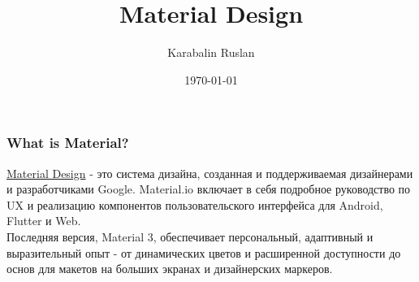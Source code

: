 \documentclass[12pt]{beamer}
\title{Material Design}
\author{Karabalin Ruslan}
\date{\today}
\begin{document}
	
	\begin{frame}

		\titlepage

	\end{frame}
	
	\begin{frame}
		\frametitle{What is Material?}
		
		\href{https://m3.material.io/}{Material Design} - это система дизайна,
        созданная и поддерживаемая дизайнерами и разработчиками Google.
        Material.io включает в себя подробное руководство по UX
        и реализацию компонентов пользовательского интерфейса
        для Android, Flutter и Web. \\
		
		Последняя версия, Material 3,
        обеспечивает персональный, адаптивный
        и выразительный опыт - от динамических цветов
        и расширенной доступности до основ
        для макетов на больших экранах и дизайнерских маркеров.
		
	\end{frame}
	
\end{document}
